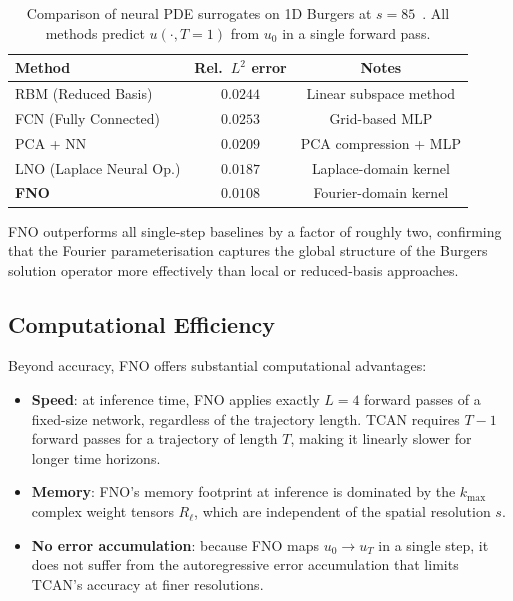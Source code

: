 \begin{table}[h!]
\centering
\begin{tabular}{lcc}
\toprule
\textbf{Method} & \textbf{Rel.\ $L^2$ error} & \textbf{Notes} \\
\midrule
RBM (Reduced Basis)     & $0.0244$ & Linear subspace method \\
FCN (Fully Connected)   & $0.0253$ & Grid-based MLP \\
PCA + NN                & $0.0209$ & PCA compression + MLP \\
LNO (Laplace Neural Op.)& $0.0187$ & Laplace-domain kernel \\
\textbf{FNO}            & $\mathbf{0.0108}$ & Fourier-domain kernel \\
\bottomrule
\end{tabular}
\caption{Comparison of neural PDE surrogates on 1D Burgers at $s=85$~\cite{li2021fourier}. All methods predict $u(\cdot, T=1)$ from $u_0$ in a single forward pass.}
\label{tab:fno-comparison}
\end{table}

FNO outperforms all single-step baselines by a factor of roughly two, confirming that the Fourier parameterisation captures the global structure of the Burgers solution operator more effectively than local or reduced-basis approaches.

\subsection{Computational Efficiency}

Beyond accuracy, FNO offers substantial computational advantages:
\begin{itemize}
  \item \textbf{Speed}: at inference time, FNO applies exactly $L=4$ forward passes of a fixed-size network, regardless of the trajectory length. TCAN requires $T-1$ forward passes for a trajectory of length $T$, making it linearly slower for longer time horizons.
  \item \textbf{Memory}: FNO's memory footprint at inference is dominated by the $k_{\max}$ complex weight tensors $R_\ell$, which are independent of the spatial resolution $s$.
  \item \textbf{No error accumulation}: because FNO maps $u_0 \to u_T$ in a single step, it does not suffer from the autoregressive error accumulation that limits TCAN's accuracy at finer resolutions.
\end{itemize}

